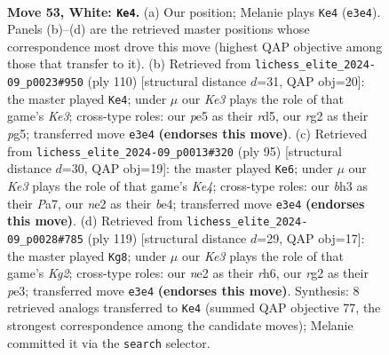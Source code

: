 \documentclass[11pt]{article}
\begin{document}
\clearpage

\begin{figure}[p]\centering
\begin{subfigure}{0.46\textwidth}\centering
\resizebox{\linewidth}{!}{%
\newchessgame
\chessboard[
  setfen={8/7p/3r4/4p1k1/1p4P1/4K2b/4n1r1/8 w - - 0 53},
  showmover=false,
  pgfstyle=straightmove, color=movearrow, markmove={e3-e4}
]}
\caption{}
\end{subfigure}\hfill
\begin{subfigure}{0.46\textwidth}\centering
\resizebox{\linewidth}{!}{%
\newchessgame
\chessboard[
  setfen={8/8/1p6/1P1r2p1/1P3n2/4K1k1/8/7r w - - 0 56},
  showmover=false,
  pgfstyle=straightmove, color=movearrow, markmove={e3-e4}
]}
\caption{}
\end{subfigure}
\\[4pt]
\begin{subfigure}{0.46\textwidth}\centering
\resizebox{\linewidth}{!}{%
\newchessgame
\chessboard[
  setfen={8/p5p1/8/4k3/4B3/2P1K3/P5R1/8 b - - 2 48},
  showmover=false,
  pgfstyle=straightmove, color=movearrow, markmove={e5-e6}
]}
\caption{}
\end{subfigure}\hfill
\begin{subfigure}{0.46\textwidth}\centering
\resizebox{\linewidth}{!}{%
\newchessgame
\chessboard[
  setfen={8/6k1/7R/5BP1/3Kp3/4P1P1/8/8 b - - 6 60},
  showmover=false,
  pgfstyle=straightmove, color=movearrow, markmove={g7-g8}
]}
\caption{}
\end{subfigure}
\caption{\textbf{Move 53, White: \texttt{Ke4}.} (a) Our position; Melanie plays \texttt{Ke4} (\texttt{e3e4}). Panels (b)--(d) are the retrieved master positions whose correspondence most drove this move (highest QAP objective among those that transfer to it). (b) Retrieved from \texttt{lichess\_elite\_2024-09\_p0023\#950} (ply 110) [structural distance $d$=31, QAP obj=20]: the master played \texttt{Ke4}; under $\mu$ our \emph{Ke3} plays the role of that game's \emph{Ke3}; cross-type roles: our \emph{p}e5 as their \emph{r}d5, our \emph{r}g2 as their \emph{p}g5; transferred move \texttt{e3e4} \textbf{(endorses this move)}. (c) Retrieved from \texttt{lichess\_elite\_2024-09\_p0013\#320} (ply 95) [structural distance $d$=30, QAP obj=19]: the master played \texttt{Ke6}; under $\mu$ our \emph{Ke3} plays the role of that game's \emph{Ke4}; cross-type roles: our \emph{b}h3 as their \emph{P}a7, our \emph{n}e2 as their \emph{b}e4; transferred move \texttt{e3e4} \textbf{(endorses this move)}. (d) Retrieved from \texttt{lichess\_elite\_2024-09\_p0028\#785} (ply 119) [structural distance $d$=29, QAP obj=17]: the master played \texttt{Kg8}; under $\mu$ our \emph{Ke3} plays the role of that game's \emph{Kg2}; cross-type roles: our \emph{n}e2 as their \emph{r}h6, our \emph{r}g2 as their \emph{p}e3; transferred move \texttt{e3e4} \textbf{(endorses this move)}. Synthesis: 8 retrieved analogs transferred to \texttt{Ke4} (summed QAP objective 77, the strongest correspondence among the candidate moves); Melanie committed it via the \texttt{search} selector.}
\label{fig:thought-m104}
\end{figure}
\end{document}
